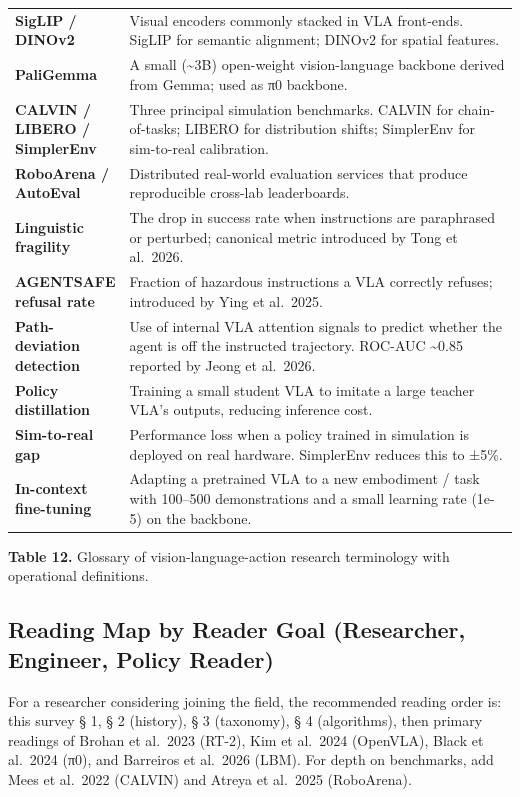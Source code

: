 \documentclass{article}
\begin{document}
\begin{table}[t]
\begin{tabular}{>{\raggedright\arraybackslash}p{0.1652\linewidth}
  >{\raggedright\arraybackslash}p{0.8348\linewidth}}
\textbf{SigLIP / DINOv2} & Visual encoders commonly stacked in VLA front-ends. SigLIP for semantic alignment; DINOv2 for spatial features. \\
\textbf{PaliGemma} & A small (\textasciitilde3B) open-weight vision-language backbone derived from Gemma; used as π0 backbone. \\
\textbf{CALVIN / LIBERO / SimplerEnv} & Three principal simulation benchmarks. CALVIN for chain-of-tasks; LIBERO for distribution shifts; SimplerEnv for sim-to-real calibration. \\
\textbf{RoboArena / AutoEval} & Distributed real-world evaluation services that produce reproducible cross-lab leaderboards. \\
\textbf{Linguistic fragility} & The drop in success rate when instructions are paraphrased or perturbed; canonical metric introduced by Tong et al.~2026. \\
\textbf{AGENTSAFE refusal rate} & Fraction of hazardous instructions a VLA correctly refuses; introduced by Ying et al.~2025. \\
\textbf{Path-deviation detection} & Use of internal VLA attention signals to predict whether the agent is off the instructed trajectory. ROC-AUC \textasciitilde0.85 reported by Jeong et al.~2026. \\
\textbf{Policy distillation} & Training a small student VLA to imitate a large teacher VLA's outputs, reducing inference cost. \\
\textbf{Sim-to-real gap} & Performance loss when a policy trained in simulation is deployed on real hardware. SimplerEnv reduces this to ±5\%. \\
\textbf{In-context fine-tuning} & Adapting a pretrained VLA to a new embodiment / task with 100--500 demonstrations and a small learning rate (1e-5) on the backbone. \\
\end{tabular}
\end{table}

\textbf{Table 12.} Glossary of vision-language-action research terminology with operational definitions.

\subsection{Reading Map by Reader Goal (Researcher, Engineer, Policy Reader)}\label{reading-map-by-reader-goal-researcher-engineer-policy-reader}

For a researcher considering joining the field, the recommended reading order is: this survey § 1, § 2 (history), § 3 (taxonomy), § 4 (algorithms), then primary readings of Brohan et al.~2023 (RT-2), Kim et al.~2024 (OpenVLA), Black et al.~2024 (π0), and Barreiros et al.~2026 (LBM). For depth on benchmarks, add Mees et al.~2022 (CALVIN) and Atreya et al.~2025 (RoboArena).
\end{document}
